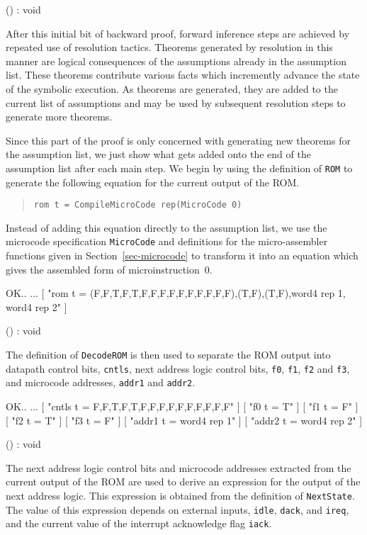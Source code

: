() : void
\endtt

After this initial bit of backward proof,
forward inference steps are achieved by repeated use of resolution
tactics.
Theorems generated by resolution in this manner are logical consequences of
the assumptions already in the assumption list.
These theorems contribute various facts which incremently advance the
state of the symbolic execution.
As theorems are generated,
they are added to the current list of assumptions and may be used
by subsequent resolution steps to generate more theorems.

Since this part of the proof
is only concerned with generating new theorems for
the assumption list,
we just show what gets added onto the end of the assumption list
after each main step.
We begin by using
the definition of \verb"ROM"
to generate the following equation for the current output of the ROM.

\begin{quote}
\verb"rom t = CompileMicroCode rep(MicroCode 0)"
\end{quote}

Instead of adding this equation directly to the assumption list,
we use the microcode specification \verb"MicroCode" and
definitions for the micro-assembler functions
given in Section~\ref{sec-microcode}
to transform it into an equation
which gives the assembled form of microinstruction~0.

\begintt
OK..
    \(\ldots\)
    [ "rom t =
       (F,F,T,F,T,F,F,F,F,F,F,F,F,F,F),(T,F),(T,F),word4 rep 1,
       word4 rep 2" ]

() : void
\endtt

The definition of \verb"DecodeROM" is then used to separate the ROM output
into datapath control bits, \verb"cntls",
next address logic control bits,
\verb"f0", \verb"f1", \verb"f2" and \verb"f3", and
microcode addresses, \verb"addr1" and \verb"addr2".

\begintt
OK..
    \(\ldots\)
    [ "cntls t = F,F,T,F,T,F,F,F,F,F,F,F,F,F,F" ]
    [ "f0 t = T" ]
    [ "f1 t = F" ]
    [ "f2 t = T" ]
    [ "f3 t = F" ]
    [ "addr1 t = word4 rep 1" ]
    [ "addr2 t = word4 rep 2" ]

() : void
\endtt

The next address logic control bits and microcode addresses
extracted from the current output of the ROM
are used to derive an expression for the output of the next address
logic.
This expression is obtained from the definition of \verb"NextState".
The value of this expression depends
on external inputs,
\verb"idle", \verb"dack", and \verb"ireq",
and the current value
of the interrupt acknowledge flag \verb"iack".

